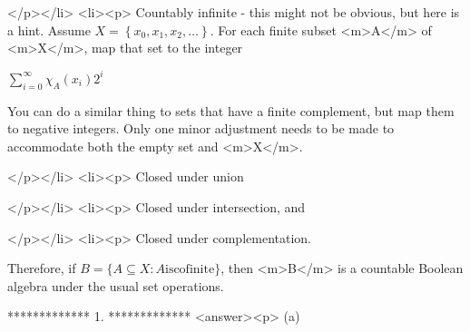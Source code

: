 </p></li>
<li><p> Countably infinite - this might not be obvious, but here is a hint.  Assume \(X=\left\{x_0,x_1,x_2,\ldots \right\}\).  For each finite subset
<m>A</m> of <m>X</m>,  map that set to the integer



\(\sum _{i=0}^{\infty } \chi _A \left(x_i\right)2^i\)  



You can do a similar thing to sets that have a finite complement, but map them to negative integers.  Only one minor adjustment needs to be made
to accommodate both the empty set and <m>X</m>.  

</p></li>
<li><p> Closed under union

</p></li>
<li><p> Closed under intersection, and

</p></li>
<li><p> Closed under complementation.



Therefore, if \(B =\{A \subseteq  X : A \text{is} \text{cofinite}\}\), then <m>B</m> is a countable Boolean algebra under the usual set operations.



*************
1.
*************
<answer><p> (a)



